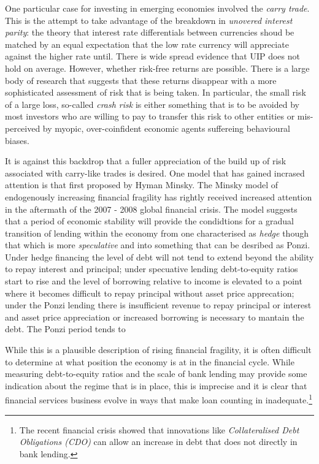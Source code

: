 \documentclass[12pt, a4paper, oneside]{article} %
\begin{document}
One particular case for investing in emerging economies involved the \emph{carry trade}.  This is the attempt to take advantage of the breakdown in \emph{unovered interest parity}: the theory that interest rate differentials between currencies shoud be matched by an equal expectation that the low rate currency will appreciate against the higher rate until.  There is wide spread evidence that UIP does not hold on average.  However, whether risk-free returns are possible.  There is a large body of research that suggests that these returns disappear with a more sophisticated assessment of risk that is being taken.  In particular, the small risk of a large loss, so-called \emph{crash risk} is either something that is to be avoided by most investors who are willing to pay to transfer this risk to other entities or  mis-perceived by myopic, over-coinfident economic agents suffereing behavioural biases.  

It is against this backdrop that a fuller appreciation of the build up of risk associated with carry-like trades is desired. One model that has gained incrased attention is that first proposed by Hyman Minsky.  The Minsky model of endogenously increasing financial fragility has rightly received increased attention in the aftermath of the 2007 - 2008 global financial crisis.  The model suggests that a period of economic stability will provide the condidtions for a gradual transition of lending within the economy from one characterised as \emph{hedge} though that which is more \emph{speculative} and into something that can be desribed as {Ponzi}.  Under hedge financing the level of debt will not tend to extend beyond the ability to repay interest and principal; under specuative lending debt-to-equity ratios start to rise and the level of borrowing relative to income is elevated to a point where it becomes difficult to repay principal without asset price apprecation; under the Ponzi lending there is insufficient revenue to repay principal or interest and asset price appreciation or increased borrowing is necessary to mantain the debt. The Ponzi period tends to 

While this is a plausible description of rising financial fragility, it is often difficult to determine at what position the economy is at in the financial cycle.  While measuring debt-to-equity ratios and the scale of bank lending may provide some indication about the regime that is in place, this is imprecise and it is clear that financial services business evolve in ways that make loan counting in inadequate.\footnote{The recent financial crisis showed that innovations like \emph{Collateralised Debt Obligations (CDO)} can allow an increase in debt that does not directly in bank lending.}   
\end{document}
